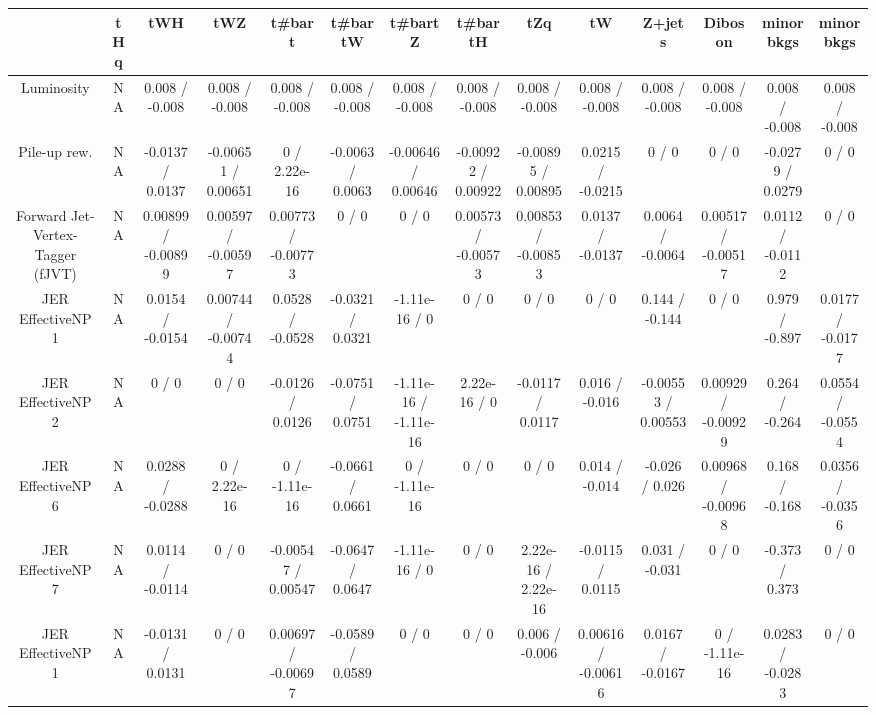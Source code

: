 \documentclass[10pt]{article}
\begin{document}
\begin{table}[htbp]
\begin{center}
\begin{tabular}{|c|c|c|c|c|c|c|c|c|c|c|c|c|c|}
\hline 
      & tHq      & tWH      & tWZ      & t#bar{t}      & t#bar{t}W      & t#bar{t}Z      & t#bar{t}H      & tZq      & tW      & Z+jets      & Diboson      & minor bkgs      & minor bkgs \\ 
\hline 
  Luminosity &    NA    & 0.008 / -0.008 & 0.008 / -0.008 & 0.008 / -0.008 & 0.008 / -0.008 & 0.008 / -0.008 & 0.008 / -0.008 & 0.008 / -0.008 & 0.008 / -0.008 & 0.008 / -0.008 & 0.008 / -0.008 & 0.008 / -0.008 & 0.008 / -0.008 \\ 
  Pile-up rew. &    NA    & -0.0137 / 0.0137 & -0.00651 / 0.00651 & 0 / 2.22e-16 & -0.0063 / 0.0063 & -0.00646 / 0.00646 & -0.00922 / 0.00922 & -0.00895 / 0.00895 & 0.0215 / -0.0215 & 0 / 0 & 0 / 0 & -0.0279 / 0.0279 & 0 / 0 \\ 
  Forward Jet-Vertex-Tagger (fJVT) &    NA    & 0.00899 / -0.00899 & 0.00597 / -0.00597 & 0.00773 / -0.00773 & 0 / 0 & 0 / 0 & 0.00573 / -0.00573 & 0.00853 / -0.00853 & 0.0137 / -0.0137 & 0.0064 / -0.0064 & 0.00517 / -0.00517 & 0.0112 / -0.0112 & 0 / 0 \\ 
  JER EffectiveNP 1 &    NA    & 0.0154 / -0.0154 & 0.00744 / -0.00744 & 0.0528 / -0.0528 & -0.0321 / 0.0321 & -1.11e-16 / 0 & 0 / 0 & 0 / 0 & 0 / 0 & 0.144 / -0.144 & 0 / 0 & 0.979 / -0.897 & 0.0177 / -0.0177 \\ 
  JER EffectiveNP 2 &    NA    & 0 / 0 & 0 / 0 & -0.0126 / 0.0126 & -0.0751 / 0.0751 & -1.11e-16 / -1.11e-16 & 2.22e-16 / 0 & -0.0117 / 0.0117 & 0.016 / -0.016 & -0.00553 / 0.00553 & 0.00929 / -0.00929 & 0.264 / -0.264 & 0.0554 / -0.0554 \\ 
  JER EffectiveNP 6 &    NA    & 0.0288 / -0.0288 & 0 / 2.22e-16 & 0 / -1.11e-16 & -0.0661 / 0.0661 & 0 / -1.11e-16 & 0 / 0 & 0 / 0 & 0.014 / -0.014 & -0.026 / 0.026 & 0.00968 / -0.00968 & 0.168 / -0.168 & 0.0356 / -0.0356 \\ 
  JER EffectiveNP 7 &    NA    & 0.0114 / -0.0114 & 0 / 0 & -0.00547 / 0.00547 & -0.0647 / 0.0647 & -1.11e-16 / 0 & 0 / 0 & 2.22e-16 / 2.22e-16 & -0.0115 / 0.0115 & 0.031 / -0.031 & 0 / 0 & -0.373 / 0.373 & 0 / 0 \\ 
  JER EffectiveNP 1 &    NA    & -0.0131 / 0.0131 & 0 / 0 & 0.00697 / -0.00697 & -0.0589 / 0.0589 & 0 / 0 & 0 / 0 & 0.006 / -0.006 & 0.00616 / -0.00616 & 0.0167 / -0.0167 & 0 / -1.11e-16 & 0.0283 / -0.0283 & 0 / 0 \\ 

\end{tabular}
\end{center}
\end{table}
\end{document}
